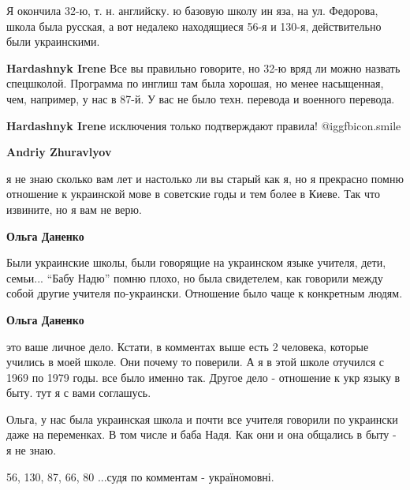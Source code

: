 \begin{itemize}
\begin{itemize}
Я окончила 32-ю, т. н. английску. ю базовую школу ин яза, на ул. Федорова, школа
была русская, а вот недалеко находящиеся 56-я и 130-я, действительно были
украинскими.

\textbf{Hardashnyk Irene} Все вы правильно говорите, но 32-ю вряд ли можно назвать спецшколой. Программа по инглиш там была хорошая, но менее насыщенная, чем, например, у нас в 87-й. У вас не было техн. перевода и военного перевода.

\textbf{Hardashnyk Irene} исключения только подтверждают правила! @igg{fbicon.smile} 

\textbf{Andriy Zhuravlyov} 

я не знаю сколько вам лет и настолько ли вы старый как я, но я прекрасно помню
отношение к украинской мове в советские годы и тем более в Киеве. Так что
извините, но я вам не верю.

\textbf{Ольга Даненко} 

Были украинские школы, были говорящие на украинском языке учителя, дети,
семьи... \enquote{Бабу Надю} помню плохо, но была свидетелем, как говорили между собой
другие учителя по-украински. Отношение было чаще к конкретным людям.

\textbf{Ольга Даненко} 

это ваше личное дело. Кстати, в комментах выше есть 2 человека, которые учились
в моей школе. Они почему то поверили. А я в этой школе отучился с 1969 по 1979
годы. все было именно так. Другое дело - отношение к укр языку в быту. тут я с
вами соглашусь.


Ольга, у нас была украинская школа и почти все учителя говорили по украински
даже на переменках. В том числе и баба Надя. Как они и она общались в быту - я
не знаю.

56, 130, 87, 66, 80 ...судя по комментам - україномовні.

\end{itemize} %


\end{itemize} %
